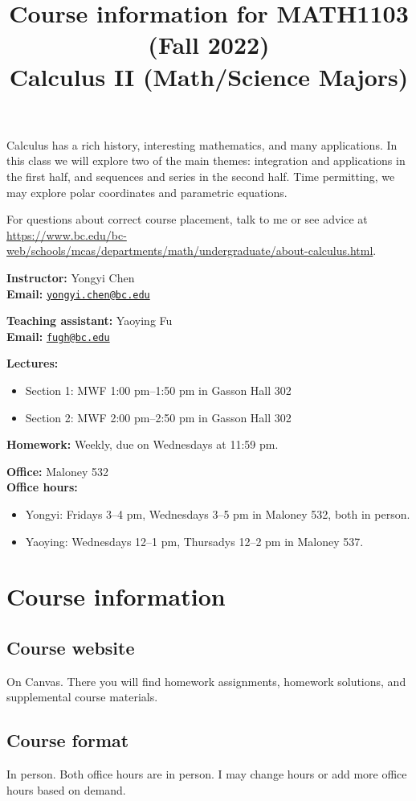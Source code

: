 \documentclass[11pt,oneside]{amsart}
\title{Course information for MATH1103 (Fall 2022)\\
    Calculus II (Math/Science Majors)}
\begin{document}
\maketitle

Calculus has a rich history, interesting mathematics, and many applications. In this class we will
explore two of the main themes: integration and applications in the first half, and sequences and series in the second half. Time permitting, we may explore polar coordinates and parametric equations.

For questions about correct course placement, talk to me or see advice at
\url{https://www.bc.edu/bc-web/schools/mcas/departments/math/undergraduate/about-calculus.html}.

\textbf{Instructor:} Yongyi Chen\\
\textbf{Email:} \href{mailto:yongyi.chen@bc.edu}{\texttt{yongyi.chen@bc.edu}}

\textbf{Teaching assistant:} Yaoying Fu\\
\textbf{Email:} \href{mailto:fugh@bc.edu}{\texttt{fugh@bc.edu}}

\textbf{Lectures:}
\begin{itemize}
    \item Section 1: MWF 1:00 pm--1:50 pm in Gasson Hall 302
    \item Section 2: MWF 2:00 pm--2:50 pm in Gasson Hall 302
\end{itemize}
\textbf{Homework:} Weekly, due on Wednesdays at 11:59 pm.

\textbf{Office:} Maloney 532\\
\textbf{Office hours:}
\begin{itemize}
    \item Yongyi: Fridays 3--4 pm, Wednesdays 3--5 pm in Maloney 532, both in person.
    \item Yaoying: Wednesdays 12--1 pm, Thursadys 12--2 pm in Maloney 537.
\end{itemize}


\section{Course information}
\subsection*{Course website}
On Canvas. There you will find homework assignments, homework solutions, and supplemental course materials.

\subsection*{Course format}
In person. Both office hours are in person. I may change hours or add more office hours based on demand.
\end{document}
